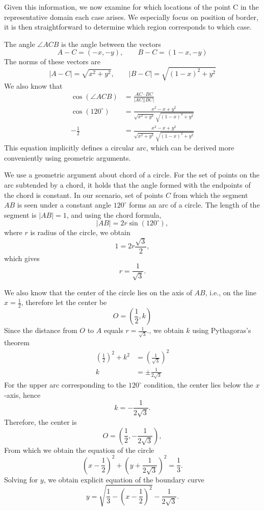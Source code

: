 \documentclass[openany]{book}
\begin{document}
	Given this information, we now examine for which locations of the point C in the representative domain each case arises. We especially focus on position of border, it is then straightforward to determine which region corresponds to which case. 
	
	The angle $\angle ACB$ is the angle between the vectors
	\[
	A - C = (-x,-y), \qquad B - C = (1-x,-y)
	\]
	The norms of these vectors are
	\[
	|A - C| = \sqrt{x^2 + y^2}, \qquad |B - C| = \sqrt{(1-x)^2 + y^2}
	\]
	We also know that
	\begin{align*}
		\cos(\angle ACB) &= \frac{AC \cdot BC}{|AC||BC|}\\
		\cos(120^\circ) &=	\frac{x^2 - x + y^2}{\sqrt{x^2 + y^2}\,\sqrt{(1-x)^2 + y^2}}\\
		-\frac{1}{2} &= \frac{x^2 - x + y^2}{\sqrt{x^2 + y^2}\,\sqrt{(1-x)^2 + y^2}}
	\end{align*}
	This equation implicitly defines a circular arc, which can be derived more conveniently using geometric arguments. 
	
	We use a geometric argument about chord of a circle. For the set of points on the arc subtended by a chord, it holds that the angle formed with the endpoints of the chord is constant. In our scenario, set of points $C$ from which the segment $AB$ is seen under a constant angle $120^\circ$ forms an arc of a circle.
	The length of the segment is $|AB| = 1$, and using the chord formula,
	\[
	|AB| = 2r \sin(120^\circ),
	\]
	where \(r\) is radius of the circle, we obtain 
	\[
	1 = 2r \frac{\sqrt{3}}{2},
	\]
	which gives
	\[
	r = \frac{1}{\sqrt{3}}.
	\]
	
	We also know that the center of the circle lies on the axis of $AB$, i.e., on the line \(x = \frac{1}{2}\), therefore let the center be
	\[
	O = \left(\frac{1}{2}, k\right)
	\]
	Since the distance from $O$ to $A$ equals \(r = \frac{1}{\sqrt{3}}.\), we obtain \(k\) using Pythagoras's theorem
	\begin{align*}
	\left(\frac{1}{2}\right)^2 + k^2 &= \left(\frac{1}{\sqrt{3}}\right)^2\\
	k &= \pm \frac{1}{2\sqrt{3}}
	\end{align*}
	For the upper arc corresponding to the $120^\circ$ condition, the center lies below the $x$-axis, hence
	\[
	k = -\frac{1}{2\sqrt{3}}.
	\]
	Therefore, the center is
	\[
	O = \left(\frac{1}{2}, -\frac{1}{2\sqrt{3}}\right),
	\]
	From which we obtain the equation of the circle
	\[
	\left(x - \frac{1}{2}\right)^2 + \left(y + \frac{1}{2\sqrt{3}}\right)^2 = \frac{1}{3}.
	\]
	Solving for $y$, we obtain explicit equation of the boundary curve
	\[
	y = \sqrt{\frac{1}{3} - \left(x - \frac{1}{2}\right)^2} - \frac{1}{2\sqrt{3}}.
	\]
	
\end{document}
